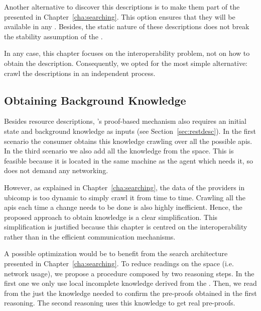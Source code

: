 Another alternative to discover this descriptions is to make them part of the \clues{} presented in Chapter~\ref{cha:searching}.
This option ensures that they will be available in any \consumer{}.
Besides, the static nature of these descriptions does not break the stability assumption of the \clues{}. %


In any case, this chapter focuses on the interoperability problem, not on how to obtain the description.
Consequently, we opted for the most simple alternative: crawl the descriptions in an independent process. %



\subsection{Obtaining Background Knowledge}

Besides resource descriptions, \citeauthor{verborgh_ijcs_2014}'s proof-based mechanism also requires an initial state and background knowledge as inputs (see Section~\ref{sec:restdesc}).
In the first scenario the consumer obtains this knowledge crawling over all the possible \acsp{api}.
In the third scenario we also add all the knowledge from the space.
This is feasible because it is located in the same machine as the agent which needs it, so does not demand any networking. %


However, as explained in Chapter~\ref{cha:searching}, the data of the providers in \ac{ubicomp} is too dynamic to simply crawl it from time to time.
Crawling all the \acsp{api} each time a change needs to be done is also highly inefficient.
Hence, the proposed approach to obtain knowledge is a clear simplification.
This simplification is justified because this chapter is centred on the interoperability rather than in the efficient communication mechanisms.


\bigskip


A possible optimization would be to benefit from the search architecture presented in Chapter~\ref{cha:searching}.
To reduce readings on the space (i.e. network usage), we propose a procedure composed by two reasoning steps.
In the first one we only use local incomplete knowledge derived from the \clues{}.
Then, we read from the \Space{} just the knowledge needed to confirm the pre-proofs obtained in the first reasoning.
The second reasoning uses this knowledge to get real pre-proofs. %


